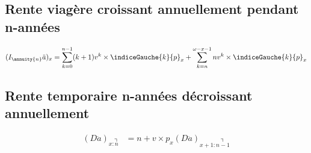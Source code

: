 \subsection{Rente viagère croissant annuellement pendant n-années}
\begin{align*}
(I_{\annuity{n}}\ddot{a})_{x} &= \sum_{k=0}^{n -1} (k+1) v^k \times  \indiceGauche{k}{p}_{x} +  \sum_{k=n}^{\omega - x -1} n v^k \times  \indiceGauche{k}{p}_{x}\\
\end{align*}


\subsection{Rente temporaire n-années décroissant annuellement}
\begin{align*}
(D\ddot{a})_{x:\annuity{n}} &= n + v \times p_x  (D\ddot{a})_{x + 1:\annuity{n -1}}\\
\end{align*}